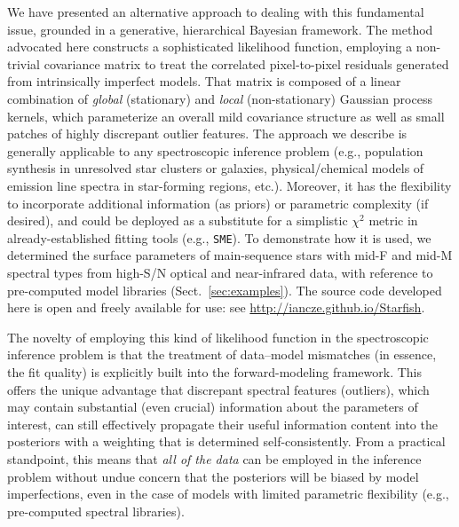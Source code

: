\documentclass[iop,floatfix,numberedappendix,twocolappendix]{emulateapj}
\begin{document}
We have presented an alternative approach to dealing with this fundamental issue, grounded in a 
generative, hierarchical Bayesian framework.  The method advocated here constructs a sophisticated 
likelihood function, employing a non-trivial covariance matrix to treat the correlated 
pixel-to-pixel residuals generated from intrinsically imperfect models.  That matrix is composed of 
a linear combination of {\it global} (stationary) and {\it local} (non-stationary) Gaussian 
process kernels, which parameterize an overall mild covariance structure as well as small patches 
of highly discrepant outlier features.  The approach we describe is generally applicable to any 
spectroscopic inference problem (e.g., population synthesis in unresolved star clusters or 
galaxies, physical/chemical models of emission line spectra in star-forming regions, etc.).  
Moreover, it has the flexibility to incorporate additional information (as priors) or parametric 
complexity (if desired), and could be deployed as a substitute for a simplistic $\chi^2$ metric in 
already-established fitting tools (e.g., {\tt SME}).  To demonstrate how it is used, we determined 
the surface parameters of main-sequence stars with mid-F and mid-M spectral types from high-S/N 
optical and near-infrared data, with reference to pre-computed model libraries 
(Sect.~\ref{sec:examples}).  The source code developed here is open and freely available for use: 
see \url{http://iancze.github.io/Starfish}.


The novelty of employing this kind of likelihood function in the spectroscopic inference problem is 
that the treatment of data--model mismatches (in essence, the fit quality) is explicitly built into 
the forward-modeling framework.  This offers the unique advantage that discrepant spectral features 
(outliers), which may contain substantial (even crucial) information about the parameters of 
interest, can still effectively propagate their useful information content into the posteriors with 
a weighting that is determined self-consistently.  From a practical standpoint, this means that 
{\it all of the data} can be employed in the inference problem without undue concern that the 
posteriors will be biased by model imperfections, even in the case of models with limited 
parametric flexibility (e.g., pre-computed spectral libraries).
\end{document}

